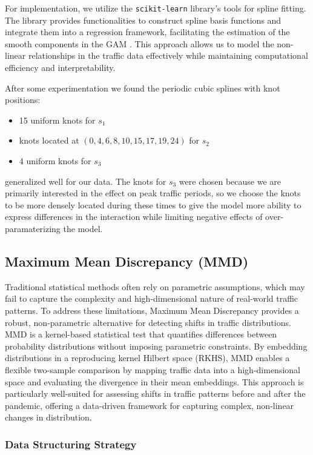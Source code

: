 \documentclass{article}
\begin{document}
For implementation, we utilize the \texttt{scikit-learn} library's tools for spline fitting. The library provides functionalities to construct spline basis functions and integrate them into a regression framework, facilitating the estimation of the smooth components in the GAM \cite{scikit-learn}. This approach allows us to model the non-linear relationships in the traffic data effectively while maintaining computational efficiency and interpretability.

After some experimentation we found the periodic cubic splines with knot positions:
\begin{itemize}
    \item 15 uniform knots for $s_1$ 
    \item knots located at $(0, 4, 6, 8, 10, 15, 17, 19, 24)$ for $s_2$
    \item 4 uniform knots for $s_3$ 
\end{itemize}
generalized well for our data. The knots for $s_3$ were chosen because we are primarily interested in the effect on peak traffic periods, so we choose the knots to be more densely located during these times to give the model more ability to express differences in the interaction while limiting negative effects of over-paramaterizing the model.

\subsection{Maximum Mean Discrepancy (MMD)}

Traditional statistical methods often rely on parametric assumptions, which may fail to capture the complexity and high-dimensional nature of real-world traffic patterns. To address these limitations, Maximum Mean Discrepancy provides a robust, non-parametric alternative for detecting shifts in traffic distributions.
MMD is a kernel-based statistical test that quantifies differences between probability distributions without imposing parametric constraints. By embedding distributions in a reproducing kernel Hilbert space (RKHS), MMD enables a flexible two-sample comparison by mapping traffic data into a high-dimensional space and evaluating the divergence in their mean embeddings. This approach is particularly well-suited for assessing shifts in traffic patterns before and after the pandemic, offering a data-driven framework for capturing complex, non-linear changes in distribution.

\subsubsection{Data Structuring Strategy}
\end{document}
